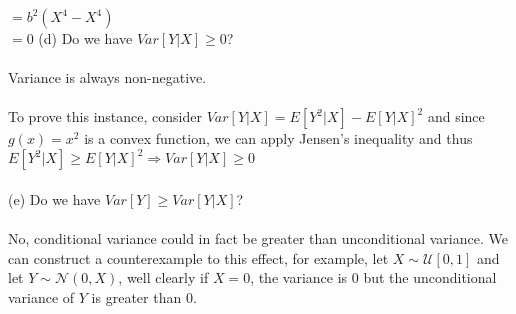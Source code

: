 \documentclass{article}
\begin{document}
$=b^2(X^4-X^4)$\\
$=0$
(d) Do we have $Var[Y|X]\geq0$?\\\\
Variance is always non-negative.\\\\
To prove this instance, consider $Var[Y|X]=E[Y^2|X]-E[Y|X]^2$ and since $g(x)=x^2$ is a convex function, we can apply Jensen's inequality and thus $E[Y^2|X]\geq E[Y|X]^2\Rightarrow Var[Y|X]\geq0$\\\\
(e) Do we have $Var[Y]\geq Var[Y|X]$?\\\\
No, conditional variance could in fact be greater than unconditional variance.  We can construct a counterexample to this effect, for example, let $X\sim\mathcal{U}[0,1]$ and let $Y\sim\mathcal{N}(0,X)$, well clearly if $X=0$, the variance is 0 but the unconditional variance of $Y$ is greater than 0. 
\end{document}
